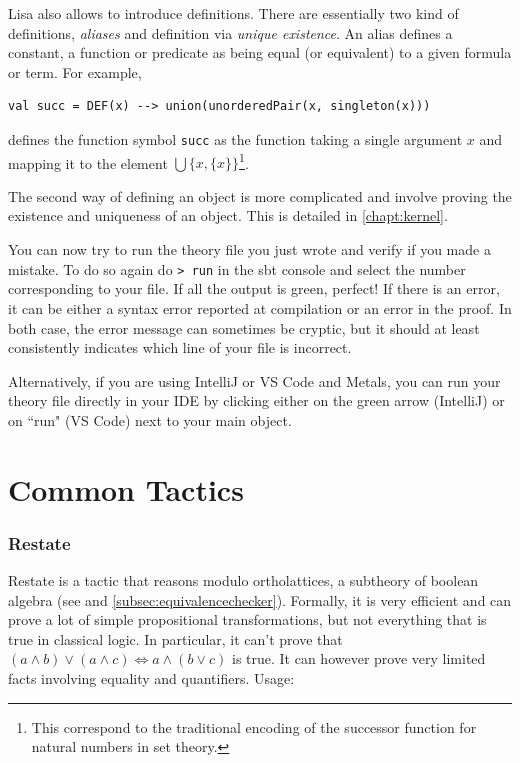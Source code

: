 Lisa also allows to introduce definitions. There are essentially two kind of definitions, \emph{aliases} and definition via \emph{unique existence}.
An alias defines a constant, a function or predicate as being equal (or equivalent) to a given formula or term. For example,

\noindent
\begin{minipage}{\linewidth}\vspace{1em}
  \begin{lstlisting}[language=lisa, frame=single]
  val succ = DEF(x) --> union(unorderedPair(x, singleton(x)))
  \end{lstlisting}
\end{minipage}
defines the function symbol \lstinline|succ| as the function taking a single argument $x$ and mapping it to the element $\bigcup \lbrace x, \lbrace x \rbrace \rbrace$\footnote{This correspond to the traditional encoding of the successor function for natural numbers in set theory.}.

The second way of defining an object is more complicated and involve proving the existence and uniqueness of an object. This is detailed in \autoref{chapt:kernel}.

You can now try to run the theory file you just wrote and verify if you made a mistake. To do so again do \lstinline|> run| in the sbt console and select the number corresponding to your file.
If all the output is green, perfect! If there is an error, it can be either a syntax error reported at compilation or an error in the proof. In both case, the error message can sometimes be cryptic, but it should at least consistently indicates which line of your file is incorrect.

Alternatively, if you are using IntelliJ or VS Code and Metals, you can run your theory file directly in your IDE by clicking either on the green arrow (IntelliJ) or on ``run" (VS Code) next to your main object.

\section{Common Tactics}
\subsubsection*{Restate}
Restate is a tactic that reasons modulo ortholattices, a subtheory of boolean algebra (see \cite{guilloudFormulaNormalizationsVerification2023} and \autoref{subsec:equivalencechecker}). Formally, it is very efficient and can prove a lot of simple propositional transformations, but not everything that is true in classical logic. In particular, it can't prove that $(a\land b) \lor (a \land c) \iff a \land (b \lor c)$ is true. It can however prove very limited facts involving equality and quantifiers. Usage:

